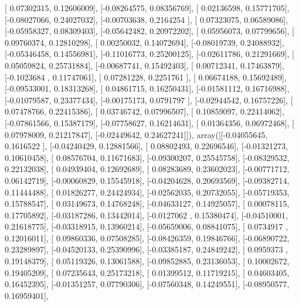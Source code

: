\documentclass{article}
\begin{document}
       [ 0.07302315,  0.12606009],
       [-0.08264575,  0.08356769],
       [ 0.02136598,  0.15771705],
       [-0.08027066,  0.24027032],
       [-0.00703638,  0.2164254 ],
       [ 0.07323075,  0.06589086],
       [-0.05958327,  0.08309403],
       [-0.05642482,  0.20972202],
       [ 0.05956073,  0.07799656],
       [ 0.09760374,  0.12810298],
       [ 0.00250032,  0.14072694],
       [-0.08019739,  0.24088932],
       [-0.05346458,  0.14556981],
       [-0.11016773,  0.25200125],
       [-0.02611786,  0.21291669],
       [ 0.05059824,  0.25731884],
       [-0.00687741,  0.15492403],
       [ 0.00712341,  0.17463879],
       [-0.1023684 ,  0.11747061],
       [ 0.07281228,  0.2251761 ],
       [ 0.06674188,  0.15692489],
       [-0.09533001,  0.18313268],
       [ 0.04861715,  0.16250431],
       [-0.01581112,  0.16716988],
       [-0.01079587,  0.23377434],
       [-0.00175173,  0.0791797 ],
       [-0.02944542,  0.16757226],
       [ 0.07478766,  0.22415386],
       [ 0.03746742,  0.07996507],
       [ 0.10859097,  0.22414062],
       [-0.07861566,  0.15387179],
       [-0.07758627,  0.16214631],
       [ 0.01364356,  0.06972468],
       [ 0.07978009,  0.21217847],
       [-0.02449642,  0.24627241]]), array([[-0.04055645,  0.1616522 ],
       [-0.04240429,  0.12881566],
       [ 0.08802493,  0.22696546],
       [-0.01321273,  0.10610458],
       [ 0.08576704,  0.11671683],
       [-0.09300207,  0.25545758],
       [-0.08329532,  0.22132038],
       [ 0.04939404,  0.12692689],
       [ 0.08283689,  0.23602023],
       [-0.00771712,  0.06142719],
       [-0.00060829,  0.15545918],
       [-0.04204628,  0.20693569],
       [-0.09382714,  0.11444488],
       [ 0.01826277,  0.24424934],
       [-0.02562035,  0.20732055],
       [-0.05719353,  0.15788547],
       [ 0.03149673,  0.14768248],
       [-0.04633127,  0.14925057],
       [ 0.00078115,  0.17705892],
       [-0.03187286,  0.13442014],
       [-0.0127062 ,  0.15380474],
       [-0.04510001,  0.21618775],
       [-0.03318915,  0.13960214],
       [-0.05659006,  0.08841075],
       [ 0.0734917 ,  0.12016011],
       [ 0.09860336,  0.07508285],
       [-0.08426359,  0.19846766],
       [-0.06890722,  0.23289897],
       [-0.04520133,  0.25390996],
       [-0.03385187,  0.24849242],
       [ 0.0959373 ,  0.19148379],
       [ 0.05119326,  0.13061588],
       [-0.09852885,  0.23136053],
       [ 0.10002672,  0.19405209],
       [ 0.07235643,  0.25173218],
       [ 0.01399512,  0.11719215],
       [ 0.04603405,  0.16452395],
       [-0.01351257,  0.07790306],
       [-0.07560348,  0.14249551],
       [-0.08950577,  0.16959401],
\end{document}
